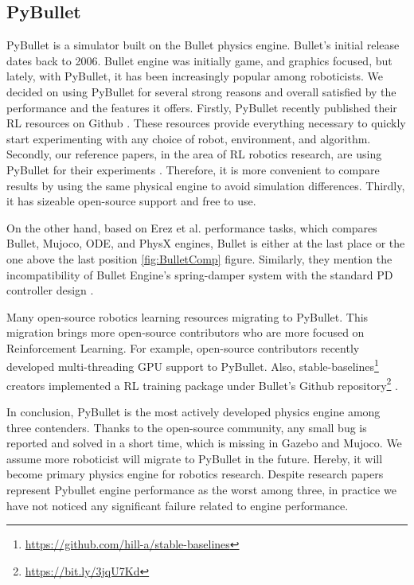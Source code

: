 \subsection{PyBullet}

PyBullet is a simulator built on the Bullet physics engine. Bullet’s initial release dates back to 2006. Bullet engine was initially game, and graphics focused, but lately, with PyBullet, it has been increasingly popular among roboticists. We decided on using PyBullet for several strong reasons and overall satisfied by the performance and the features it offers. Firstly, PyBullet recently published their RL resources on Github \cite{RLBullet}. These resources provide everything necessary to quickly start experimenting with any choice of robot, environment, and algorithm. Secondly, 
our reference papers, in the area of RL robotics research, are using PyBullet for their experiments \cite{Quillen2018} \cite{Breyer2018}. Therefore, it is more convenient to compare results by using the same physical engine to avoid simulation differences. Thirdly, it has sizeable open-source support and free to use. 

On the other hand, based on Erez et al. performance tasks, which compares Bullet, Mujoco, ODE, and PhysX engines, Bullet is either at the last place or the one above the last position \ref{fig:BulletComp} figure. Similarly, they mention the incompatibility of Bullet Engine’s spring-damper system with the standard PD controller design \cite{Erez2015}.

Many open-source robotics learning resources migrating to PyBullet. This migration brings more open-source contributors who are more focused on Reinforcement Learning. For example, open-source contributors recently developed multi-threading GPU support to PyBullet. Also, stable-baselines\footnote{\url{https://github.com/hill-a/stable-baselines}} creators implemented a RL training package under Bullet’s Github repository\footnote{\url{https://bit.ly/3jqU7Kd}} \cite{stable-baselines}. 

In conclusion, PyBullet is the most actively developed physics engine among three contenders. Thanks to the open-source community, any small bug is reported and solved in a short time, which is missing in Gazebo and Mujoco. We assume more roboticist will migrate to PyBullet in the future. Hereby, it will become primary physics engine for robotics research. Despite research papers represent Pybullet engine performance as the worst among three, in practice we have not noticed any significant failure related to engine performance.


